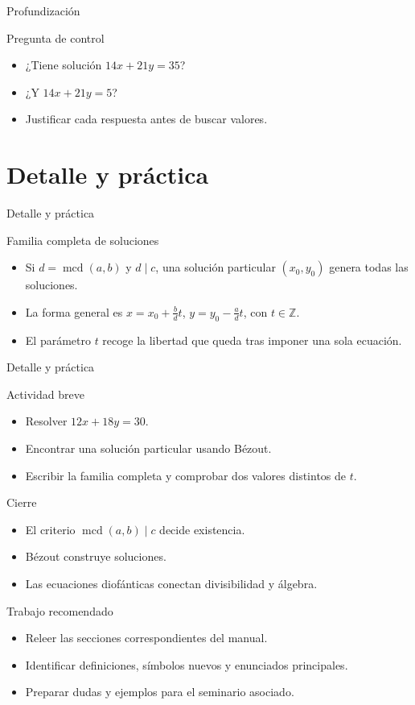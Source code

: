\documentclass[aspectratio=169,11pt]{beamer}
\newcommand{\mcd}{\operatorname{mcd}}
\begin{document}
\begin{frame}{Profundización}
\begin{block}{Pregunta de control}
\begin{itemize}
  \item ¿Tiene solución \(14x+21y=35\)?
  \item ¿Y \(14x+21y=5\)?
  \item Justificar cada respuesta antes de buscar valores.
\end{itemize}
\end{block}
\end{frame}


\section{Detalle y práctica}

\begin{frame}{Detalle y práctica}
\begin{block}{Familia completa de soluciones}
\begin{itemize}
  \item Si \(d=\mcd(a,b)\) y \(d\mid c\), una solución particular \((x_0,y_0)\) genera todas las soluciones.
  \item La forma general es \(x=x_0+\frac{b}{d}t\), \(y=y_0-\frac{a}{d}t\), con \(t\in\mathbb{Z}\).
  \item El parámetro \(t\) recoge la libertad que queda tras imponer una sola ecuación.
\end{itemize}
\end{block}
\end{frame}

\begin{frame}{Detalle y práctica}
\begin{block}{Actividad breve}
\begin{itemize}
  \item Resolver \(12x+18y=30\).
  \item Encontrar una solución particular usando Bézout.
  \item Escribir la familia completa y comprobar dos valores distintos de \(t\).
\end{itemize}
\end{block}
\end{frame}

\begin{frame}{Cierre}
\begin{itemize}
  \item El criterio \(\mcd(a,b)\mid c\) decide existencia.
  \item Bézout construye soluciones.
  \item Las ecuaciones diofánticas conectan divisibilidad y álgebra.
\end{itemize}
\end{frame}

\begin{frame}{Trabajo recomendado}
\begin{itemize}
  \item Releer las secciones correspondientes del manual.
  \item Identificar definiciones, símbolos nuevos y enunciados principales.
  \item Preparar dudas y ejemplos para el seminario asociado.
\end{itemize}
\end{frame}
\end{document}
